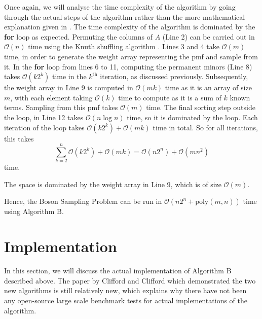 \documentclass[11pt]{article}
\theoremstyle{theorem}
\theoremstyle{theorem}
\theoremstyle{remark}
\theoremstyle{note}
\theoremstyle{plain}
\theoremstyle{definition}
\begin{document}
Once again, we will analyse the time complexity of the algorithm by going through the actual steps of the algorithm rather than the more mathematical explanation given in \cite{clifford17}. The time complexity of the algorithm is dominated by the \textbf{for} loop as expected. Permuting the columns of $A$ (Line 2) can be carried out in $\mathcal{O}(n)$ time using the Knuth shuffling algorithm \cite{knuth1969}. Lines 3 and 4 take $\mathcal{O}(m)$ time, in order to generate the weight array representing the pmf and sample from it. In the \textbf{for} loop from lines 6 to 11, computing the permanent minors (Line 8) takes $\mathcal{O}(k 2^k)$ time in the $k^{\text{th}}$ iteration, as discussed previously. Subsequently, the weight array in Line 9 is computed in $\mathcal{O}(mk)$ time as it is an array of size $m$, with each element taking $\mathcal{O}(k)$ time to compute as it is a sum of $k$ known terms. Sampling from this pmf takes $\mathcal{O}(m)$ time. The final sorting step outside the loop, in Line 12 takes $\mathcal{O}(n \log n)$ time, so it is dominated by the loop. Each iteration of the loop takes $\mathcal{O}(k 2^k) + \mathcal{O}(mk)$ time in total. So for all iterations, this takes
\begin{equation}
\sum_{k=2}^n \mathcal{O}(k2^k) + \mathcal{O}(mk) = \mathcal{O}(n2^n) + \mathcal{O}(mn^2)
\end{equation}
time. 

The space is dominated by the weight array in Line 9, which is of size $\mathcal{O}(m)$.

Hence, the Boson Sampling Problem can be run in $\mathcal{O}(n2^n + \text{poly}(m, n))$ time using Algorithm B.

\section{Implementation} %

In this section, we will discuss the actual implementation of Algorithm B described above. The paper by Clifford and Clifford which demonstrated the two new algorithms is still relatively new, which explains why there have not been any open-source large scale benchmark tests for actual implementations of the algorithm.
\end{document}
